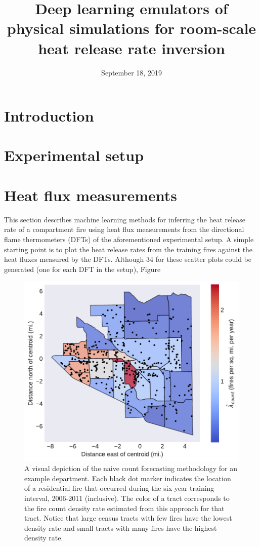 \documentclass{article}
\begin{document}
\title{Deep learning emulators of physical simulations for room-scale heat release rate inversion}
\author{}
\date{September 18, 2019}

\maketitle

\begin{abstract}

\end{abstract}




\section{Introduction}
\section{Experimental setup}

\section{Heat flux measurements}
This section describes machine learning methods for inferring the heat release rate of a compartment fire using heat flux measurements from the directional flame thermometers (DFTs) of the aforementioned experimental setup. A simple starting point is to plot the heat release rates from the training fires against the heat fluxes measured by the DFTs. Although 34 for these scatter plots could be generated (one for each DFT in the setup), Figure 


\begin{figure}[htbp] \centering
\includegraphics[width=.75\textwidth]{./figures/spatial_histogram.pdf}
\caption{A visual depiction of the naive count forecasting methodology for an example department. Each black dot marker indicates the location of a residential fire that occurred during the six-year training interval, 2006-2011 (inclusive). The color of a tract corresponds to the fire count density rate estimated from this approach for that tract. Notice that large census tracts with few fires have the lowest density rate and small tracts with many fires have the highest density rate.}
\label{fig:spatial_histogram}
\end{figure}








\clearpage


\end{document}
